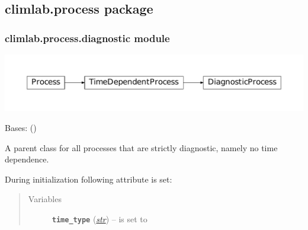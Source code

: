 \documentclass[a4paper,10pt,english]{sphinxmanual}
\begin{document}
\subsection{climlab.process package}
\label{api/climlab.process:climlab-process-package}\label{api/climlab.process::doc}

\subsubsection{climlab.process.diagnostic module}
\label{api/climlab.process:climlab-process-diagnostic-module}
\includegraphics{inheritance-1888e33f5a851ed75afcf967b0ab7f3cd6fbbc2c.pdf}
\label{api/climlab.process:module-climlab.process.diagnostic}

\begin{fulllineitems}
\label{api/climlab.process:climlab.process.diagnostic.DiagnosticProcess}
Bases: {\hyperref[api/climlab.process:climlab.process.time_dependent_process.TimeDependentProcess]{\emph{}}} ()

A parent class for all processes that are strictly diagnostic, namely
no time dependence.

During initialization following attribute is set:
\begin{quote}\begin{description}
\item[{Variables}] \leavevmode
\textbf{\texttt{time\_type}} (\href{http://docs.python.org/2.7/library/functions.html\#str}{\emph{str}}) -- is set to 

\end{description}\end{quote}

\end{fulllineitems}
\end{document}
